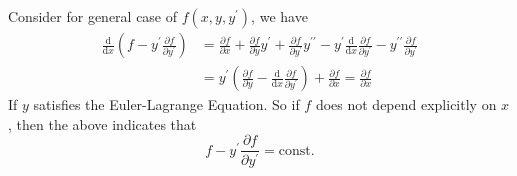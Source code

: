 \documentclass{article}
\begin{document}
Consider for general case of $f(x,y,y^\prime)$, we have
\begin{align*}
    \frac{\mathrm d}{\mathrm dx}\left( f-y^\prime\frac{\partial f}{\partial y^\prime} \right)&=\frac{\partial f}{\partial x}+\frac{\partial f}{\partial y}y^\prime+\frac{\partial f}{\partial y^\prime}y^{\prime\prime}-y^\prime\frac{\mathrm d}{\mathrm dx}\frac{\partial f}{\partial y^\prime}-y^{\prime\prime}\frac{\partial f}{\partial y^\prime}\\
    &=y^\prime\left( \frac{\partial f}{\partial y}-\frac{\mathrm d}{\mathrm dx}\frac{\partial f}{\partial y^\prime} \right)+\frac{\partial f}{\partial x}
    =\frac{\partial f}{\partial x}
\end{align*}
If $y$ satisfies the Euler-Lagrange Equation.
So if $f$ does not depend explicitly on $x$, then the above indicates that
$$f-y^\prime\frac{\partial f}{\partial y^\prime}=\text{const.}$$
\end{document}

